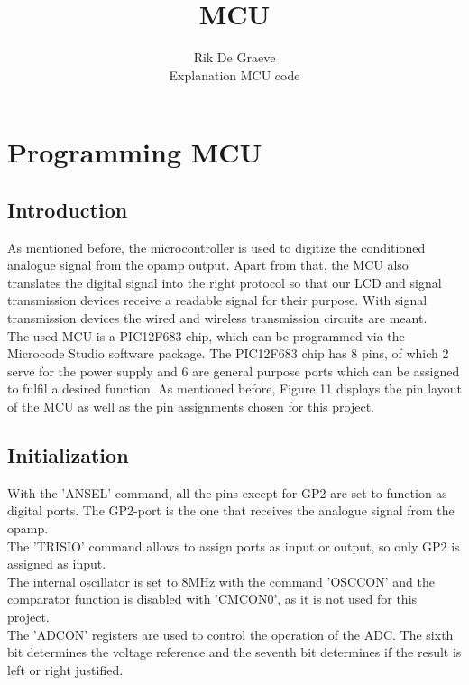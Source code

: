 \documentclass[12pt]{article}
\begin{document}
 
 
\title{ MCU }
\author{Rik De Graeve\\ %
Explanation MCU code}

\section{Programming MCU}
\subsection{Introduction}
As mentioned before, the microcontroller is used to digitize the conditioned analogue signal from the opamp output. Apart from that, the MCU also translates the digital signal into the right protocol so that our LCD and signal transmission devices receive a readable signal for their purpose. With signal transmission devices the wired and wireless transmission circuits are meant.\\

\noindent The used MCU is a PIC12F683 chip, which can be programmed via the Microcode Studio software package. The PIC12F683 chip has 8 pins, of which 2 serve for the power supply and 6 are general purpose ports which can be assigned to fulfil a desired function. As mentioned before, Figure 11 displays the pin layout of the MCU as well as the pin assignments chosen for this project.

\subsection{Initialization}

With the ’ANSEL’ command, all the pins except for GP2 are set to function as digital ports. The GP2-port is the one that receives the analogue signal from the opamp. \\

\noindent The ’TRISIO’ command allows to assign ports as input or output, so only GP2 is assigned as input. \\

\noindent The internal oscillator is set to 8MHz with the command ’OSCCON’ and the comparator function is disabled with ’CMCON0’, as it is not used for this project.\\

\noindent The ’ADCON’ registers are used to control the operation of the ADC. The sixth bit determines the voltage reference and the seventh bit determines if the result is left or right justified.\\
\end{document}

